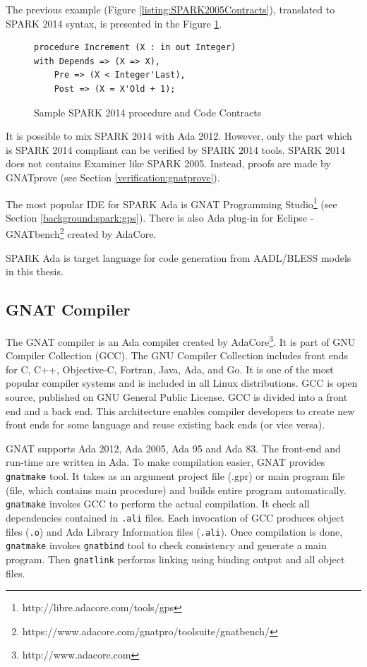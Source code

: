 The previous example (Figure \ref{listing:SPARK2005Contracts}), translated to SPARK 2014 syntax, is presented in the Figure \ref{listing:SPARK2014Contracts}.

\begin{figure}[ht]
\singlespacing
\begin{lstlisting}[language=ada2012, frame=single, gobble=0]
procedure Increment (X : in out Integer)
with Depends => (X => X),
	Pre => (X < Integer'Last),
	Post => (X = X'Old + 1);
\end{lstlisting}
\doublespacing
\caption{Sample SPARK 2014 procedure and Code Contracts}
\label{listing:SPARK2014Contracts}
\end{figure}

It is possible to mix SPARK 2014 with Ada 2012. However, only the part which is SPARK 2014 compliant can be verified by SPARK 2014 tools. SPARK 2014 does not contains Examiner like SPARK 2005. Instead, proofs are made by GNATprove (see Section \ref{verification:gnatprove}).

The most popular IDE for SPARK Ada is GNAT Programming Studio\footnote{http://libre.adacore.com/tools/gps} (see Section \ref{background:spark:gps}). There is also Ada plug-in for Eclipse - GNATbench\footnote{https://www.adacore.com/gnatpro/toolsuite/gnatbench/} created by AdaCore. 

SPARK Ada is target language for code generation from AADL/BLESS models in this thesis.


\subsection{GNAT Compiler}
\label{background:spark:gnat}

The GNAT compiler is an Ada compiler created by AdaCore\footnote{http://www.adacore.com}. It is part of GNU Compiler Collection (GCC). The GNU Compiler Collection includes front ends for C, C++, Objective-C, Fortran, Java, Ada, and Go. It is one of the most popular compiler systems and is included in all Linux distributions. GCC is open source, published on GNU General Public License. GCC is divided into a front end and a back end. This architecture enables compiler developers to create new front ends for some language and reuse existing back ends (or vice versa).

GNAT supports Ada 2012, Ada 2005, Ada 95 and Ada 83. The front-end and run-time are written in Ada. To make compilation easier, GNAT provides \lstinline{gnatmake} tool. It takes as an argument project file (.gpr) or main program file (file, which contains main procedure) and builds entire program automatically. \lstinline{gnatmake} invokes GCC to perform the actual compilation. It check all dependencies contained in \lstinline{.ali} files. Each invocation of GCC produces object files (\lstinline{.o}) and Ada Library Information files (\lstinline{.ali}). Once compilation is done, \lstinline{gnatmake} invokes \lstinline{gnatbind} tool to check consistency and generate a main program. Then \lstinline{gnatlink} performs linking using binding output and all object files.

